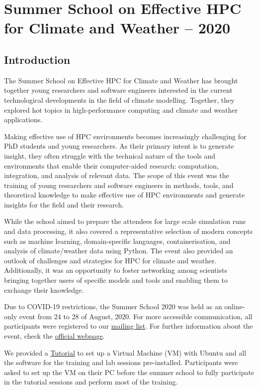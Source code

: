 \chapter{Summer School on Effective HPC for Climate and Weather -- 2020}
\label{ch:ss2020}

\section{Introduction}

The Summer School on Effective HPC for Climate and Weather has brought together young researchers and software engineers interested in the current technological developments in the field of climate modelling. Together, they explored hot topics in high-performance computing and climate and weather applications.

Making effective use of HPC environments becomes increasingly challenging for PhD students and young researchers. As their primary intent is to generate insight, they often struggle with the technical nature of the tools and environments that enable their computer-aided research: computation, integration, and analysis of relevant data. The scope of this event was the training of young researchers and software engineers in methods, tools, and theoretical knowledge to make effective use of HPC environments and generate insights for the field and their research.

While the school aimed to prepare the attendees for large scale simulation runs and data processing, it also covered a representative selection of modern concepts such as machine learning, domain-specific languages, containerisation, and analysis of climate/weather data using Python. The event also provided an outlook of challenges and strategies for HPC for climate and weather. Additionally, it was an opportunity to foster networking among scientists bringing together users of specific models and tools and enabling them to exchange their knowledge.

Due to COVID-19 restrictions, the Summer School 2020 was held as an online-only event from 24 to 28 of August, 2020. For more accessible communication, all participants were registered to our \href{https://hps.vi4io.org/mailman/listinfo/hps-summer-school}{mailing list}. For further information about the event, check the \href{https://hps.vi4io.org/events/2020/esiwace-school}{official webpage}.

We provided a \href{https://docs.google.com/document/d/1f9dDjTSnaCtGoJNQYa8eb3U6jCjQ_rjmVsDSo16cRzk/edit?usp=sharing}{Tutorial} to set up a Virtual Machine (VM) with Ubuntu and all the software for the training and lab sessions pre-installed. Participants were asked to set up the VM on their PC before the summer school to fully participate in the tutorial sessions and perform most of the training.

